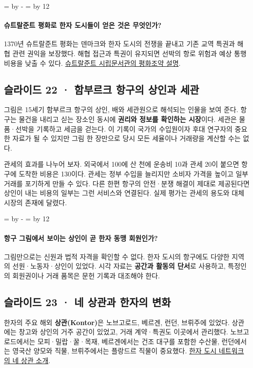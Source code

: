 \documentclass[10pt,a4paper]{article}
\newcommand{\ReserveQuestionSpace}{%
  \par\begingroup
  \dimen0=\pagegoal \advance\dimen0 by -\pagetotal
  \dimen2=\baselineskip \multiply\dimen2 by 12
  \ifdim\dimen0<\dimen2 \newpage\fi
  \endgroup}
\begin{document}
\ReserveQuestionSpace
\paragraph{슈트랄준트 평화로 한자 도시들이 얻은 것은 무엇인가?}
1370년 슈트랄준트 평화는 덴마크와 한자 도시의 전쟁을 끝내고 기존 교역 특권과 해협 관련 권익을 보장했다. 해협 접근과 특권이 유지되면 선박의 항로 위험과 예상 통행 비용을 낮출 수 있다. \href{https://stadtarchiv.stralsund.de/stralsunder-frieden/geschichte/}{슈트랄준트 시립문서관의 평화조약 설명}.\par

\subsection{슬라이드 22 · 함부르크 항구의 상인과 세관}
그림은 15세기 함부르크 항구의 상인, 배와 세관원으로 해석되는 인물을 보여 준다. 항구는 물건을 내리고 싣는 장소인 동시에 \textbf{권리와 정보를 확인하는 시장}이다. 세관은 물품·선박을 기록하고 세금을 걷는다. 이 기록이 국가의 수입원이자 후대 연구자의 중요한 자료가 될 수 있지만 그림 한 장만으로 당시 모든 세율이나 거래량을 계산할 수는 없다.\par

관세의 효과를 나누어 보자. 외국에서 100에 산 천에 운송비 10과 관세 20이 붙으면 항구에 도착한 비용은 130이다. 관세는 정부 수입을 늘리지만 소비자 가격을 높이고 일부 거래를 포기하게 만들 수 있다. 다른 한편 항구의 안전·분쟁 해결이 제대로 제공된다면 상인이 내는 비용의 일부는 그런 서비스와 연결된다. 실제 평가는 관세의 용도와 대체 시장의 존재에 달렸다.\par

\ReserveQuestionSpace
\paragraph{항구 그림에서 보이는 상인이 곧 한자 동맹 회원인가?}
그림만으로는 신원과 법적 자격을 확인할 수 없다. 한자 도시의 항구에도 다양한 지역의 선원·노동자·상인이 있었다. 시각 자료는 \textbf{공간과 활동의 단서}로 사용하고, 특정인의 회원권이나 거래 품목은 문헌 기록과 대조해야 한다.\par

\subsection{슬라이드 23 · 네 상관과 한자의 변화}
한자의 주요 해외 \textbf{상관(Kontor)}은 노브고로드, 베르겐, 런던, 브뤼주에 있었다. 상관에는 창고와 상인의 거주 공간이 있었고, 거래 계약·특권도 이곳에서 관리했다. 노브고로드에서는 모피·밀랍·꿀·목재, 베르겐에서는 건조 대구를 포함한 수산물, 런던에서는 영국산 양모와 직물, 브뤼주에서는 플랑드르 직물이 중요했다. \href{https://www.hanse.org/en/the-medieval-hanseatic-league/die-kontore}{한자 도시 네트워크의 네 상관 소개}.\par
\end{document}
